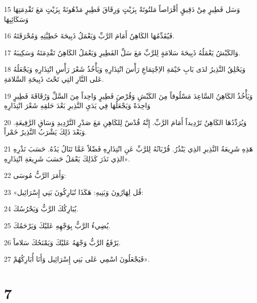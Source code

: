 \par 15 وَسَل فَطِيرٍ مِنْ دَقِيقٍ أَقْرَاصاً مَلتُوتَةً بِزَيْتٍ وَرِقَاقَ فَطِيرٍ مَدْهُونَةً بِزَيْتٍ مَعَ تَقْدِمَتِهَا وَسَكَائِبِهَا
\par 16 فَيُقَدِّمُهَا الكَاهِنُ أَمَامَ الرَّبِّ وَيَعْمَلُ ذَبِيحَةَ خَطِيَّتِهِ وَمُحْرَقَتَهُ.
\par 17 وَالكَبْشُ يَعْمَلُهُ ذَبِيحَةَ سَلامَةٍ لِلرَّبِّ مَعَ سَلِّ الفَطِيرِ وَيَعْمَلُ الكَاهِنُ تَقْدِمَتَهُ وَسَكِيبَهُ.
\par 18 وَيَحْلِقُ النَّذِيرُ لدَى بَابِ خَيْمَةِ الاِجْتِمَاعِ رَأْسَ انْتِذَارِهِ وَيَأْخُذُ شَعْرَ رَأْسِ انْتِذَارِهِ وَيَجْعَلُهُ عَلى النَّارِ التِي تَحْتَ ذَبِيحَةِ السَّلامَةِ.
\par 19 وَيَأْخُذُ الكَاهِنُ السَّاعِدَ مَسْلُوقاً مِنَ الكَبْشِ وَقُرْصَ فَطِيرٍ وَاحِداً مِنَ السَّلِّ وَرُقَاقَةَ فَطِيرٍ وَاحِدَةً وَيَجْعَلُهَا فِي يَدَيِ النَّذِيرِ بَعْدَ حَلقِهِ شَعْرَ انْتِذَارِهِ
\par 20 وَيُرَدِّدُهَا الكَاهِنُ تَرْدِيداً أَمَامَ الرَّبِّ. إِنَّهُ قُدْسٌ لِلكَاهِنِ مَعَ صَدْرِ التَّرْدِيدِ وَسَاقِ الرَّفِيعَةِ. وَبَعْدَ ذَلِكَ يَشْرَبُ النَّذِيرُ خَمْراً.
\par 21 هَذِهِ شَرِيعَةُ النَّذِيرِ الذِي يَنْذُرُ. قُرْبَانُهُ لِلرَّبِّ عَنِ انْتِذَارِهِ فَضْلاً عَمَّا تَنَالُ يَدُهُ. حَسَبَ نَذْرِهِ الذِي نَذَرَ كَذَلِكَ يَعْمَلُ حَسَبَ شَرِيعَةِ انْتِذَارِهِ».
\par 22 وَأَمَرَ الرَّبُّ مُوسَى:
\par 23 «قُل لِهَارُونَ وَبَنِيهِ: هَكَذَا تُبَارِكُونَ بَنِي إِسْرَائِيل:
\par 24 يُبَارِكُكَ الرَّبُّ وَيَحْرُسُكَ.
\par 25 يُضِيءُ الرَّبُّ بِوَجْهِهِ عَليْكَ وَيَرْحَمُكَ.
\par 26 يَرْفَعُ الرَّبُّ وَجْهَهُ عَليْكَ وَيَمْنَحُكَ سَلاماً.
\par 27 فَيَجْعَلُونَ اسْمِي عَلى بَنِي إِسْرَائِيل وَأَنَا أُبَارِكُهُمْ».

\chapter{7}

